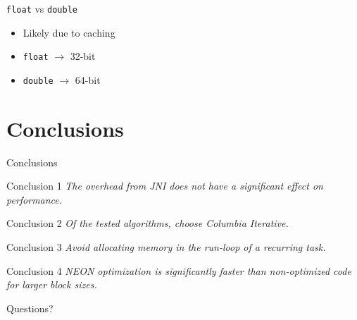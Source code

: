 \documentclass[xcolor={table}]{beamer}
\begin{document}
\begin{frame}{\texttt{float} vs \texttt{double}}
    \begin{itemize}
        \item Likely due to caching
        \item \texttt{float} $\rightarrow$ 32-bit
        \item \texttt{double} $\rightarrow$ 64-bit
    \end{itemize}
\end{frame}


\section{Conclusions}
\begin{frame}{Conclusions}
    \begin{block}{Conclusion 1}
        \emph{The overhead from JNI does not have a significant effect on performance.}
    \end{block}
    \begin{block}{Conclusion 2}
        \emph{Of the tested algorithms, choose Columbia Iterative.}
    \end{block}
    \begin{block}{Conclusion 3}
        \emph{Avoid allocating memory in the run-loop of a recurring task.}
    \end{block}
    \begin{block}{Conclusion 4}
        \emph{NEON optimization is significantly faster than non-optimized code for larger block sizes.} %
    \end{block}
\end{frame}

\begin{frame}
    \Huge{\centerline{Questions?}}
\end{frame}
\end{document}
